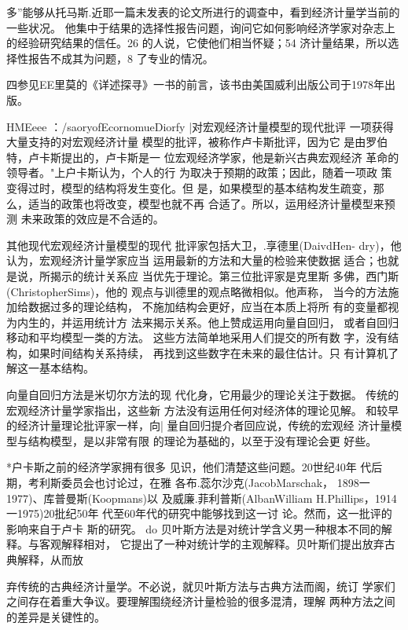 多”能够从托马斯.近耶一篇未发表的论文所进行的调查中，看到经济计量学当前的一些状况。
他集中于结果的选择性报告问题，询问它如何影响经济学家对杂志上的经验研究结果的信任。26%
的人说，它使他们相当怀疑；54%
济计量结果，所以选择性报告不成其为问题，8%
了专业的情况。

四参见EE里莫的《详述探寻》一书的前言，该书由美国威利出版公司于1978年出版。

HMEeee
：/saoryofEcornomueDiorfy
|对宏观经济计量模型的现代批评
一项获得大量支持的对宏观经济计量
模型的批评，被称作卢卡斯批评，因为它
是由罗伯特，卢卡斯提出的，卢卡斯是一
位宏观经济学家，他是新兴古典宏观经济
革命的领导者。"上户卡斯认为，个人的行
为取决于预期的政策；因此，随着一项政
策变得过时，模型的结构将发生变化。但
是，如果模型的基本结构发生疏变，那
么，适当的政策也将改变，模型也就不再
合适了。所以，运用经济计量模型来预测
未来政策的效应是不合适的。

其他现代宏观经济计量模型的现代
批评家包括大卫，.享德里(DaivdHen-
dry)，他认为，宏观经济计量学家应当
运用最新的方法和大量的检验来使数据
适合；也就是说，所揭示的统计关系应
当优先于理论。第三位批评家是克里斯
多佛，西门斯(ChristopherSims)，他的
观点与训德里的观点略微相似。他声称，
当今的方法施加给数据过多的理论结构，
不施加结构会更好，应当在本质上将所
有的变量都视为内生的，并运用统计方
法来揭示关系。他上赞成运用向量自回归，
或者自回归移动和平均模型一类的方法。
这些方法简单地采用人们提交的所有数
字，没有结构，如果时间结构关系持续，
再找到这些数字在未来的最住估计。只
有计算机了解这一基本结构。

向量自回归方法是米切尔方法的现
代化身，它用最少的理论关注于数据。
传统的宏观经济计量学家指出，这些新
方法没有运用任何对经济体的理论见解。
和较早的经济计量理论批评家一样，向|
量自回归提介者回应说，传统的宏观经
济计量模型与结构模型，是以非常有限
的理论为基础的，以至于没有理论会更
好些。


*户卡斯之前的经济学家拥有很多
见识，他们清楚这些问题。20世纪40年
代后期，考利斯委员会也讨论过，在雅
各布.蕊尔沙克(JacobMarschak，
1898一1977)、库普曼斯(Koopmans)以
及威廉.菲利普斯(AlbanWilliam
H.Phillips，1914一1975)20批纪50年
代至60年代的研究中能够找到这一讨
论。然而，这一批评的影响来自于卢卡
斯的研究。
do
贝叶斯方法是对统计学含义男一种根本不同的解释。与客观解释相对，
它提出了一种对统计学的主观解释。贝叶斯们提出放弃古典解释，从而放

弃传统的古典经济计量学。不必说，就贝叶斯方法与古典方法而阁，统订
学家们之间存在着重大争议。要理解围绕经济计量检验的很多混清，理解
两种方法之间的差异是关键性的。

